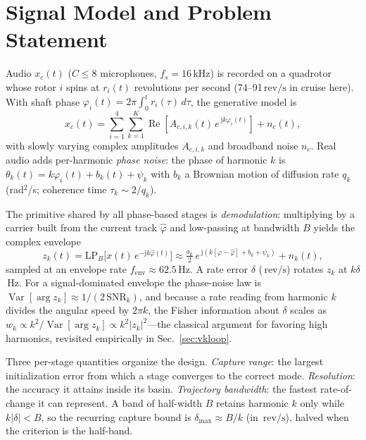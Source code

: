 \documentclass[journal]{IEEEtran}
\newcommand{\revps}{\ensuremath{\,\mathrm{rev/s}}}
\newcommand{\fsenv}{\ensuremath{f_{\mathrm{env}}}}
\newcommand{\snr}{\ensuremath{\mathrm{SNR}}}
\begin{document}
\section{Signal Model and Problem Statement}
\label{sec:model}

Audio $x_c(t)$ ($C \le 8$ microphones, $f_s = 16$\,kHz) is recorded on a
quadrotor whose rotor $i$ spins at $r_i(t)$ revolutions per second
(74--91\revps{} in cruise here). With shaft phase
$\varphi_i(t) = 2\pi \int_0^t r_i(\tau)\,d\tau$, the generative model is
\begin{equation}
  x_c(t) = \sum_{i=1}^{4} \sum_{k=1}^{K}
  \operatorname{Re}\!\left[ A_{c,i,k}(t)\, e^{\,\mathrm{j} k \varphi_i(t)}
  \right] + n_c(t),
  \label{eq:model}
\end{equation}
with slowly varying complex amplitudes $A_{c,i,k}$ and broadband noise
$n_c$. Real audio adds per-harmonic \emph{phase noise}: the phase of
harmonic $k$ is $\theta_k(t) = k\varphi_i(t) + b_k(t) + \psi_k$ with
$b_k$ a Brownian motion of diffusion rate $q_k$ (rad$^2$/s; coherence
time $\tau_k \sim 2/q_k$).

The primitive shared by all phase-based stages is \emph{demodulation}:
multiplying by a carrier built from the current track $\hat\varphi$ and
low-passing at bandwidth $B$ yields the complex envelope
\begin{equation}
  z_k(t) = \mathrm{LP}_B\!\big[ x(t)\, e^{-\mathrm{j} k \hat\varphi(t)}
  \big] \approx \tfrac{a_k}{2}\,
  e^{\,\mathrm{j}(k[\varphi-\hat\varphi] + b_k + \psi_k)} + n_k(t),
  \label{eq:envelope}
\end{equation}
sampled at an envelope rate $\fsenv \approx 62.5$\,Hz. A rate error
$\delta$ (\revps) rotates $z_k$ at $k\delta$\,Hz. For a signal-dominated
envelope the phase-noise law is
$\operatorname{Var}[\arg z_k] \approx 1/(2\,\snr_k)$, and because a rate
reading from harmonic $k$ divides the angular speed by $2\pi k$, the
Fisher information about $\delta$ scales as
$w_k \propto k^2 / \operatorname{Var}[\arg z_k] \propto k^2 |z_k|^2$---the
classical argument for favoring high harmonics, revisited empirically in
Sec.~\ref{sec:vkloop}.

Three per-stage quantities organize the design. \emph{Capture range}: the
largest initialization error from which a stage converges to the correct
mode. \emph{Resolution}: the accuracy it attains inside its basin.
\emph{Trajectory bandwidth}: the fastest rate-of-change it can represent.
A band of half-width $B$ retains harmonic $k$ only while $k|\delta| < B$,
so the recurring capture bound is $\delta_{\max} \approx B/k$ (in \revps),
halved when the criterion is the half-band.
\end{document}

